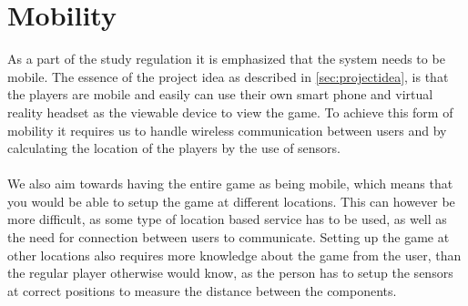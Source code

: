 \section{Mobility}\label{sec:mobility}
As a part of the study regulation it is emphasized that the system needs to be mobile.
The essence of the project idea as described in \autoref{sec:projectidea}, is that the players are mobile and easily can use their own smart phone and virtual reality headset as the viewable device to view the game.
To achieve this form of mobility it requires us to handle wireless communication between users and by calculating the location of the players by the use of sensors.
\\\\
We also aim towards having the entire game as being mobile, which means that you would be able to setup the game at different locations.
This can however be more difficult, as some type of location based service has to be used, as well as the need for connection between users to communicate.
Setting up the game at other locations also requires more knowledge about the game from the user, than the regular player otherwise would know, as the person has to setup the sensors at correct positions to measure the distance between the components.